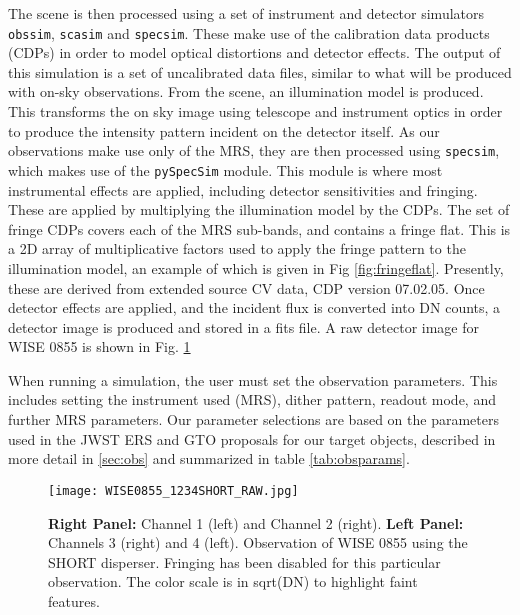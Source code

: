 The scene is then processed using a set of instrument and detector simulators \verb|obssim|, \verb|scasim| and \verb|specsim|.
These make use of the calibration data products (CDPs) in order to model optical distortions and detector effects.
The output of this simulation is a set of uncalibrated data files, similar to what will be produced with on-sky observations.
From the scene, an illumination model is produced. This transforms the on sky image using telescope and instrument optics in order to produce the intensity pattern incident on the detector itself.
As our observations make use only of the MRS, they are then processed using \verb|specsim|, which makes use of the \verb|pySpecSim| module.
This module is where most instrumental effects are applied, including detector sensitivities and fringing.
These are applied by multiplying the illumination model by the CDPs. 
The set of fringe CDPs covers each of the MRS sub-bands, and contains a fringe flat.
This is a 2D array of multiplicative factors used to apply the fringe pattern to the illumination model, an example of which is given in Fig \ref{fig:fringeflat}. 
Presently, these are derived from extended source CV data, CDP version 07.02.05.
Once detector effects are applied, and the incident flux is converted into DN counts, a detector image is produced and stored in a fits file.
A raw detector image for WISE 0855 is shown in Fig. \ref{fig:0855raw}

When running a simulation, the user must set the observation parameters.
This includes setting the instrument used (MRS), dither pattern, readout mode, and further MRS parameters.
Our parameter selections  are based on the parameters used in the JWST ERS and GTO proposals for our target objects, described in more detail in \ref{sec:obs} and summarized in table \ref{tab:obsparams}.
\begin{figure}[t]
	\texttt{[image: WISE0855\_1234SHORT\_RAW.jpg]}
	\caption{\textbf{Right Panel:} Channel 1 (left) and Channel 2 (right). \textbf{Left Panel:} Channels 3 (right) and 4 (left). Observation of WISE 0855 using the SHORT disperser. Fringing has been disabled for this particular observation. The color scale is in sqrt(DN) to highlight faint features.}
	\label{fig:0855raw}
\end{figure}

